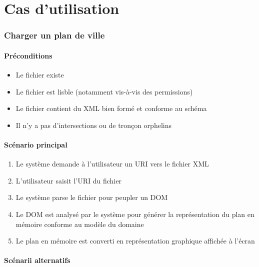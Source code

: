 \part{Cas d'utilisation}

\section{Charger un plan de ville}

\subsection{Préconditions}

\begin{itemize}
\item Le fichier existe
\item Le fichier est lisble (notamment vis-à-vis des permissions)
\item Le fichier contient du XML bien formé et conforme au schéma
\item Il n'y a pas d'intersections ou de tronçon orphelins
\end{itemize}

\subsection{Scénario principal}

\begin{enumerate}
\item Le système demande à l'utilisateur un URI vers le fichier XML
\item L'utilisateur saisit l'URI du fichier
\item Le système parse le fichier pour peupler un DOM
\item Le DOM est analysé par le système pour générer la représentation du plan en mémoire conforme au modèle du domaine
\item Le plan en mémoire est converti en représentation graphique affichée à l'écran
\end{enumerate}

\subsection{Scénarii alternatifs}

